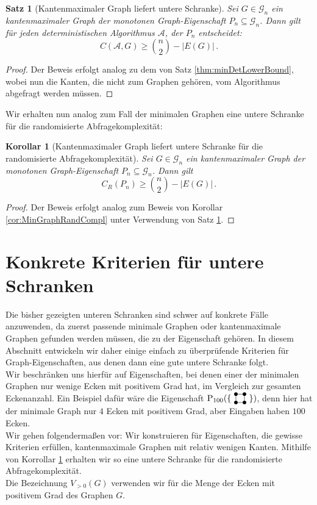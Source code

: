 \documentclass[10pt,a4paper, footheight=1mm]{scrreprt}
\newtheorem{Satz}[definition]{Satz}
\newtheorem{corollary}[definition]{Korollar}
\theoremstyle{definition}
\newcommand{\Square}{
\begin{tikzpicture}[main_node/.style={circle,fill=black},
inner sep=1.5pt, baseline=2pt]

    \node[main_node] (1) at (0,0) {};
    \node[main_node] (2) at (0.35, 0)  {};
    \node[main_node] (3) at (0.35, 0.35) {};
    \node[main_node] (4) at (0, 0.35) {};

    \draw (1) -- (2) -- (3) -- (4) -- (1);
\end{tikzpicture}
}
\begin{document}
\begin{Satz}[Kantenmaximaler Graph liefert untere Schranke]
\label{thm:EdgeMaxGraphLowerBound}
Sei $G\in \mathcal{G}_n$ ein kantenmaximaler Graph der monotonen
Graph-Eigenschaft $P_n \subseteq \mathcal{G}_n$.
Dann gilt für jeden deterministischen Algorithmus $\mathcal{A}$,
der $P_n$ entscheidet: 
$$ C(\mathcal{A}, G) \geq \binom{n}{2} - |E(G)|\,.$$
\end{Satz}
\begin{proof}
Der Beweis erfolgt analog zu dem von Satz \ref{thm:minDetLowerBound},
wobei nun die Kanten, die nicht zum Graphen gehören, vom Algorithmus
abgefragt werden müssen.
\end{proof}
Wir erhalten nun analog zum Fall der minimalen Graphen eine untere
Schranke für die randomisierte Abfragekomplexität:
\begin{corollary} [Kantenmaximaler Graph liefert untere Schranke
für die randomisierte Abfragekomplexität]
\label{thm:EdgeMaximalRandCompl}
Sei $G\in\mathcal{G}_n$ ein kantenmaximaler Graph der monotonen
Graph-Eigenschaft $P_n \subseteq \mathcal{G}_n$.
Dann gilt
$$ C_R(P_n) \geq \binom{n}{2} - |E(G)|\,.$$
\end{corollary}
\begin{proof}
Der Beweis erfolgt analog zum Beweis von Korollar \ref{cor:MinGraphRandCompl}
unter Verwendung von Satz \ref{thm:EdgeMaxGraphLowerBound}.
\end{proof}

\section{Konkrete Kriterien für untere Schranken}
Die bisher gezeigten unteren Schranken sind schwer auf konkrete
Fälle anzuwenden, da zuerst passende minimale Graphen oder kantenmaximale
Graphen gefunden werden müssen, die zu der Eigenschaft gehören.
In diesem Abschnitt entwickeln wir daher einige einfach zu überprüfende
Kriterien für Graph-Eigenschaften, aus denen dann eine gute
untere Schranke folgt. \\
Wir beschränken uns hierfür auf Eigenschaften, bei denen einer
der minimalen Graphen nur wenige Ecken mit positivem Grad hat,
im Vergleich zur gesamten Eckenanzahl. Ein Beispiel dafür wäre
die Eigenschaft $\operatorname{P}_{100}(\{ \ \Square \ \})$,
denn hier hat der minimale Graph nur $4$ Ecken mit positivem
Grad, aber Eingaben haben $100$ Ecken. \\
Wir gehen folgendermaßen vor: Wir konstruieren für Eigenschaften,
die gewisse Kriterien erfüllen, kantenmaximale Graphen mit 
relativ wenigen Kanten. Mithilfe von Korrollar 
\ref{thm:EdgeMaximalRandCompl} erhalten wir so eine untere Schranke
für die randomisierte Abfragekomplexität. \\
Die Bezeichnung $V_{>0}(G)$ verwenden wir für die
Menge der Ecken mit positivem Grad des Graphen $G$.
\end{document}
